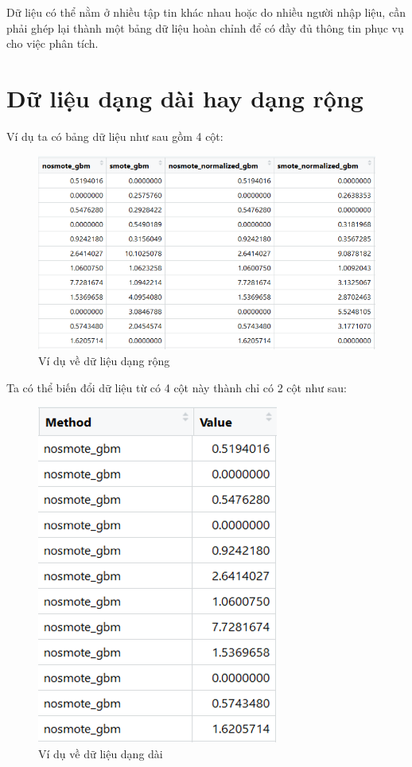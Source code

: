 \documentclass[]{tufte-book}
\begin{document}
Dữ liệu có thể nằm ở nhiều tập tin khác nhau hoặc do nhiều người nhập liệu, cần phải ghép lại thành một bảng dữ liệu hoàn chỉnh để có đầy đủ thông tin phục vụ cho việc phân tích.

\hypertarget{d-liu-dang-dai-hay-dang-rng}{%
\section{Dữ liệu dạng dài hay dạng rộng}\label{d-liu-dang-dai-hay-dang-rng}}

Ví dụ ta có bảng dữ liệu như sau gồm 4 cột:

\begin{figure}
\centering
\includegraphics{figures/02_05.png}
\caption{Ví dụ về dữ liệu dạng rộng}
\end{figure}

Ta có thể biến đổi dữ liệu từ có 4 cột này thành chỉ có 2 cột như sau:

\begin{figure}
\centering
\includegraphics{figures/02_06.png}
\caption{Ví dụ về dữ liệu dạng dài}
\end{figure}
\end{document}
